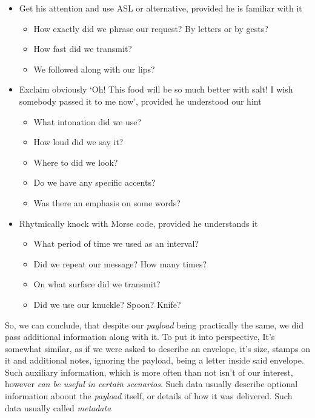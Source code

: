 \documentclass[../../what-is-computer.tex]{subfiles}
\begin{document}
\begin{itemize}
        \item Get his attention and use ASL or alternative, provided he is familiar with it
        \begin{itemize}
            \item How exactly did we phrase our request? By letters or by gests?
            \item How fast did we transmit?
            \item We followed along with our lips?
        \end{itemize}

        \item Exclaim obviously `Oh! This food will be so much better with salt! I wish somebody passed it to me now', provided he understood our hint
        \begin{itemize}
            \item What intonation did we use?
            \item How loud did we say it?
            \item Where to did we look?
            \item Do we have any specific accents?
            \item Was there an emphasis on some words?
        \end{itemize}

        \item Rhytmically knock with Morse code, provided he understands it
        \begin{itemize}
            \item What period of time we used as an interval?
            \item Did we repeat our message? How many times?
            \item On what surface did we transmit?
            \item Did we use our knuckle? Spoon? Knife?
        \end{itemize}
    \end{itemize}

    So, we can conclude, that despite our \emph{payload} being practically the same, we did pass additional information along with it. To put it into perspective,
    It's somewhat similar, as if we were asked to describe an envelope, it's size, stamps on it and additional notes, ignoring the payload, being a letter inside
    said envelope. Such auxiliary information, which is more often than not isn't of our interest, however \emph{can be useful in certain scenarios}. Such data
    usually describe optional information aboout the \emph{payload} itself, or details of how it was delivered. Such data usually called \emph{metadata}
\end{document}
